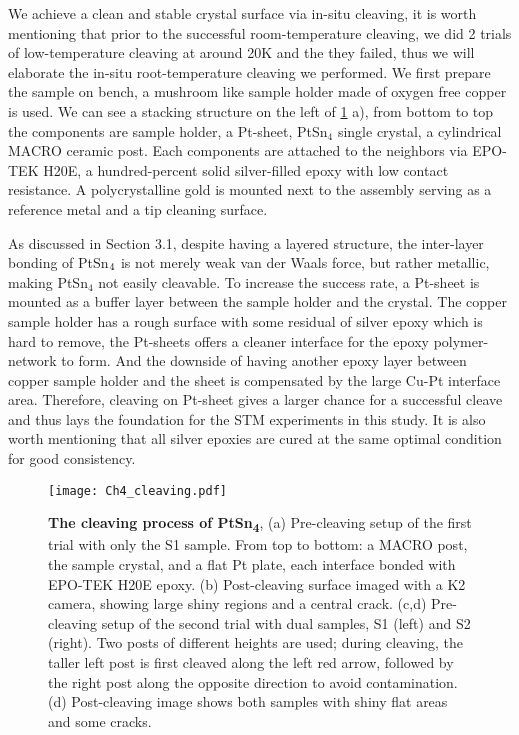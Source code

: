 \par We achieve a clean and stable crystal surface via in-situ cleaving, it is worth mentioning that prior to the successful room-temperature cleaving, we did 2 trials of low-temperature cleaving at around 20K and the they failed, thus we will elaborate the in-situ root-temperature cleaving we performed. We first prepare the sample on bench, a mushroom like sample holder made of oxygen free copper is used. We can see a stacking structure on the left of \ref{fig:ch4_cleaves} a), from bottom to top the components are sample holder, a Pt-sheet, PtSn$_4$ single crystal, a cylindrical MACRO ceramic post. Each components are attached to the neighbors via EPO-TEK H20E, a hundred-percent solid silver-filled epoxy with low contact resistance. A polycrystalline gold is mounted next to the assembly serving as a reference metal and a tip cleaning surface. 

\par As discussed in Section 3.1, despite having a layered structure, the inter-layer bonding of PtSn$\textsubscript{4}$ is not merely weak van der Waals force, but rather metallic, making PtSn$_4$ not easily cleavable. To increase the success rate, a Pt-sheet is mounted as a buffer layer between the sample holder and the crystal. The copper sample holder has a rough surface with some residual of silver epoxy which is hard to remove, the Pt-sheets offers a cleaner interface for the epoxy polymer-network to form. And the downside of having another epoxy layer between copper sample holder and the sheet is compensated by the large Cu-Pt interface area. Therefore, cleaving on Pt-sheet gives a larger chance for a successful cleave and thus lays the foundation for the \ac{STM} experiments in this study. It is also worth mentioning that all silver epoxies are cured at the same optimal condition for good consistency. 

\begin{figure}
	\centering
	\texttt{[image: Ch4\_cleaving.pdf]}
	\caption[\textbf{The cleaving process of PtSn\textsubscript{4}}]{\textbf{The cleaving process of PtSn\textsubscript{4}}, (a) Pre-cleaving setup of the first trial with only the S1 sample. From top to bottom: a MACRO post, the sample crystal, and a flat Pt plate, each interface bonded with EPO-TEK H20E epoxy. (b) Post-cleaving surface imaged with a K2 camera, showing large shiny regions and a central crack. (c,d) Pre-cleaving setup of the second trial with dual samples, S1 (left) and S2 (right). Two posts of different heights are used; during cleaving, the taller left post is first cleaved along the left red arrow, followed by the right post along the opposite direction to avoid contamination. (d) Post-cleaving image shows both samples with shiny flat areas and some cracks.}
	\label{fig:ch4_cleaves}
\end{figure}

